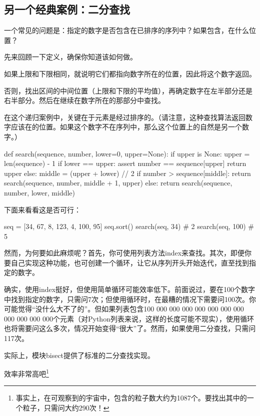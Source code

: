 \subsection{另一个经典案例：二分查找}
一个常见的问题是：指定的数字是否包含在已排序的序列中？如果包含，在什么位置？

先来回顾一下定义，确保你知道该如何做。
\begin{dinglist}{43}
    \item 如果上限和下限相同，就说明它们都指向数字所在的位置，因此将这个数字返回。
    \item 否则，找出区间的中间位置（上限和下限的平均值），再确定数字在左半部分还是右半部分。然后在继续在数字所在的那部分中查找。
\end{dinglist}

在这个递归案例中，关键在于元素是经过排序的。（请注意，这种查找算法返回数字应该在的位置。如果这个数字不在序列中，那么这个位置上的自然是另一个数字。）

\begin{pyc}
def search(sequence, number, lower=0, upper=None):
    if upper is None:
        upper = len(sequence) - 1
    if lower == upper:
        assert number == sequence[upper]
        return upper
    else:
        middle = (upper + lower) // 2
        if number > sequence[middle]:
            return search(sequence, number, middle + 1, upper)
        else:
            return search(sequence, number, lower, middle)
\end{pyc}

下面来看看这是否可行：
\begin{pyc}
seq = [34, 67, 8, 123, 4, 100, 95]
seq.sort()
search(seq, 34)  # 2
search(seq, 100)  # 5
\end{pyc}

然而，为何要如此麻烦呢？首先，你可使用列表方法index来查找。其次，即便你要自己实现这种功能，也可创建一个循环，让它从序列开头开始迭代，直至找到指定的数字。

确实，使用index挺好，但使用简单循环可能效率低下。前面说过，要在100个数字中找到指定的数字，只需问7次；但使用循环时，在最糟的情况下需要问100次。你可能觉得``没什么大不了的”。但如果列表包含100 000 000 000 000 000 000 000 000 000 000 000个元素（对Python列表来说，这样的长度可能不现实），使用循环也将需要问这么多次，情况开始变得“很大”了。然而，如果使用二分查找，只需问117次。
\begin{tcolorbox}[breakable]
    实际上，模块bisect提供了标准的二分查找实现。
\end{tcolorbox}

效率非常高吧\footnote{事实上，在可观察到的宇宙中，包含的粒子数大约为1087个。要找出其中的一个粒子，只需问大约290次！}


